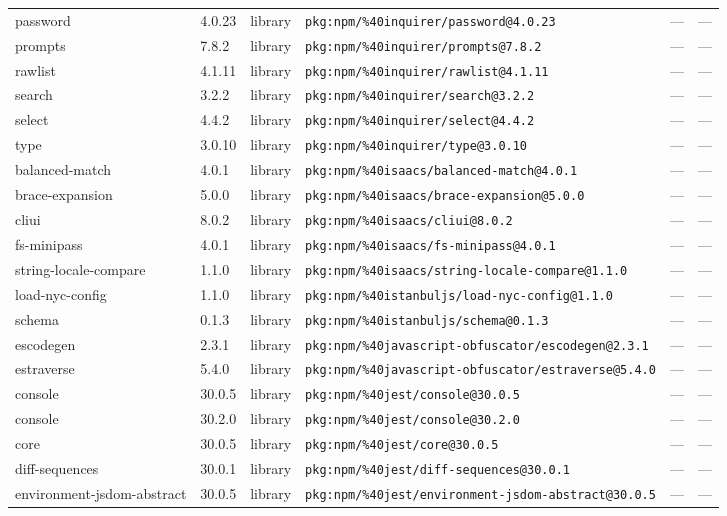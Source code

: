 \documentclass[11pt]{article}
\begin{document}
\begin{longtable}{|l|l|l|p{2.2cm}|l|p{4cm}|}
password & 4.0.23 & library & \texttt{pkg:npm/\%40inquirer/password@4.0.23} & — & — \\
prompts & 7.8.2 & library & \texttt{pkg:npm/\%40inquirer/prompts@7.8.2} & — & — \\
rawlist & 4.1.11 & library & \texttt{pkg:npm/\%40inquirer/rawlist@4.1.11} & — & — \\
search & 3.2.2 & library & \texttt{pkg:npm/\%40inquirer/search@3.2.2} & — & — \\
select & 4.4.2 & library & \texttt{pkg:npm/\%40inquirer/select@4.4.2} & — & — \\
type & 3.0.10 & library & \texttt{pkg:npm/\%40inquirer/type@3.0.10} & — & — \\
balanced-match & 4.0.1 & library & \texttt{pkg:npm/\%40isaacs/balanced-match@4.0.1} & — & — \\
brace-expansion & 5.0.0 & library & \texttt{pkg:npm/\%40isaacs/brace-expansion@5.0.0} & — & — \\
cliui & 8.0.2 & library & \texttt{pkg:npm/\%40isaacs/cliui@8.0.2} & — & — \\
fs-minipass & 4.0.1 & library & \texttt{pkg:npm/\%40isaacs/fs-minipass@4.0.1} & — & — \\
string-locale-compare & 1.1.0 & library & \texttt{pkg:npm/\%40isaacs/string-locale-compare@1.1.0} & — & — \\
load-nyc-config & 1.1.0 & library & \texttt{pkg:npm/\%40istanbuljs/load-nyc-config@1.1.0} & — & — \\
schema & 0.1.3 & library & \texttt{pkg:npm/\%40istanbuljs/schema@0.1.3} & — & — \\
escodegen & 2.3.1 & library & \texttt{pkg:npm/\%40javascript-obfuscator/escodegen@2.3.1} & — & — \\
estraverse & 5.4.0 & library & \texttt{pkg:npm/\%40javascript-obfuscator/estraverse@5.4.0} & — & — \\
console & 30.0.5 & library & \texttt{pkg:npm/\%40jest/console@30.0.5} & — & — \\
console & 30.2.0 & library & \texttt{pkg:npm/\%40jest/console@30.2.0} & — & — \\
core & 30.0.5 & library & \texttt{pkg:npm/\%40jest/core@30.0.5} & — & — \\
diff-sequences & 30.0.1 & library & \texttt{pkg:npm/\%40jest/diff-sequences@30.0.1} & — & — \\
environment-jsdom-abstract & 30.0.5 & library & \texttt{pkg:npm/\%40jest/environment-jsdom-abstract@30.0.5} & — & — \\

\end{longtable}
\end{document}
